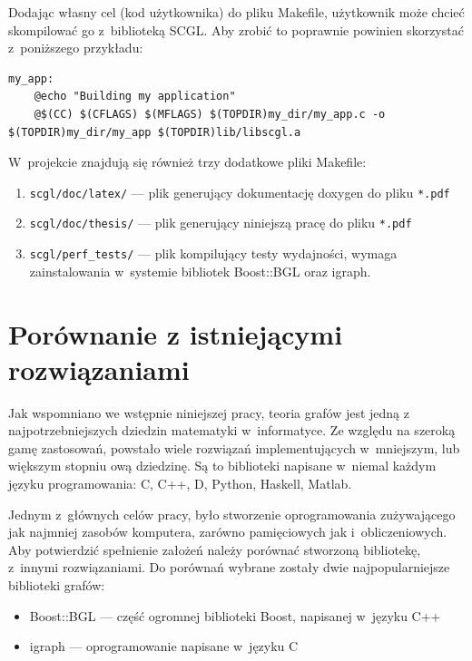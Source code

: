 \documentclass[a4paper,12pt,polish,twoside,openright]{thesis}
\newcommand\code[1]{\lstinline[style=line]{#1}}
\begin{document}
Dodając własny cel (kod użytkownika) do pliku Makefile, użytkownik może chcieć skompilować go z~biblioteką SCGL.
Aby zrobić to poprawnie powinien skorzystać z~poniższego przykładu:
\begin{lstlisting}[style=coden]
my_app:
	@echo "Building my application"
	@$(CC) $(CFLAGS) $(MFLAGS) $(TOPDIR)my_dir/my_app.c -o $(TOPDIR)my_dir/my_app $(TOPDIR)lib/libscgl.a
\end{lstlisting}

W~projekcie znajdują się również trzy dodatkowe pliki Makefile:
\begin{enumerate}
	\item \code{scgl/doc/latex/} --- plik generujący dokumentację doxygen do pliku \code{*.pdf}
	\item \code{scgl/doc/thesis/} --- plik generujący niniejszą pracę do pliku \code{*.pdf}
	\item \code{scgl/perf_tests/} --- plik kompilujący testy wydajności, wymaga zainstalowania w~systemie bibliotek Boost::BGL oraz igraph.
\end{enumerate}


\chapter{Porównanie z istniejącymi rozwiązaniami}
\label{chap:tests}
Jak wspomniano we wstępnie niniejszej pracy, teoria grafów jest jedną z najpotrzebniejszych dziedzin matematyki w~informatyce.
Ze względu na szeroką gamę zastosowań, powstało wiele rozwiązań implementujących w~mniejszym, lub większym stopniu ową dziedzinę.
Są to biblioteki napisane w~niemal każdym języku programowania: C, C++, D, Python, Haskell, Matlab.

Jednym z~głównych celów pracy, było stworzenie oprogramowania zużywającego jak najmniej zasobów komputera, zarówno pamięciowych jak i~obliczeniowych.
Aby potwierdzić spełnienie założeń należy porównać stworzoną bibliotekę, z~innymi rozwiązaniami.
Do porównań wybrane zostały dwie najpopularniejsze biblioteki grafów:
\begin{itemize}
	\item Boost::BGL --- część ogromnej biblioteki Boost, napisanej w~języku C++
	\item igraph --- oprogramowanie napisane w~języku C
\end{itemize}
\end{document}
